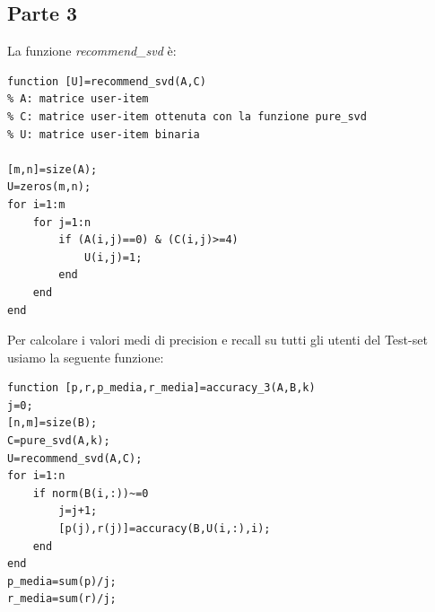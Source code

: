 \documentclass[11pt,a4paper,twoside,openright,titlepage,
                           headinclude,footinclude,BCOR5mm,
                           numbers=noenddot,cleardoublepage=empty,
                           tablecaptionabove]{scrbook}
\begin{document}
\subsection{\textbf{Parte 3}}
La funzione \emph{recommend\_svd} è:
\begin{lstlisting}[frame=trBL]
function [U]=recommend_svd(A,C)
% A: matrice user-item
% C: matrice user-item ottenuta con la funzione pure_svd
% U: matrice user-item binaria

[m,n]=size(A);
U=zeros(m,n);
for i=1:m
    for j=1:n
        if (A(i,j)==0) & (C(i,j)>=4)
            U(i,j)=1;
        end
    end
end
\end{lstlisting}
Per calcolare i valori medi di precision e recall su tutti gli utenti del Test-set usiamo la seguente funzione:
\newpage
\begin{lstlisting}[frame=trBL]
function [p,r,p_media,r_media]=accuracy_3(A,B,k)
j=0;
[n,m]=size(B);
C=pure_svd(A,k);
U=recommend_svd(A,C);
for i=1:n
    if norm(B(i,:))~=0
        j=j+1;
        [p(j),r(j)]=accuracy(B,U(i,:),i);
    end
end
p_media=sum(p)/j;
r_media=sum(r)/j;
\end{lstlisting}
\end{document}
